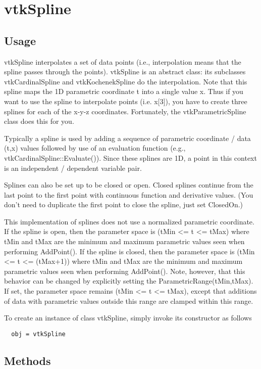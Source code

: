 \section{vtkSpline}

\subsection{Usage}

 vtkSpline interpolates a set of data points (i.e., interpolation means
 that the spline passes through the points).  vtkSpline is an abstract
 class: its subclasses vtkCardinalSpline and vtkKochenekSpline do the
 interpolation. Note that this spline maps the 1D parametric coordinate
 t into a single value x. Thus if you want to use the spline to 
 interpolate points (i.e. x[3]), you have to create three splines for
 each of the x-y-z coordinates. Fortunately, the vtkParametricSpline
 class does this for you.

 Typically a spline is used by adding a sequence of parametric coordinate /
 data (t,x) values followed by use of an evaluation function (e.g.,
 vtkCardinalSpline::Evaluate()).  Since these splines are 1D, a point in
 this context is an independent / dependent variable pair. 

 Splines can also be set up to be closed or open. Closed splines continue
 from the last point to the first point with continuous function and 
 derivative values. (You don't need to duplicate the first point to close
 the spline, just set ClosedOn.) 

 This implementation of splines does not use a normalized parametric
 coordinate. If the spline is open, then the parameter space is (tMin <= t
 <= tMax) where tMin and tMax are the minimum and maximum parametric values
 seen when performing AddPoint(). If the spline is closed, then the
 parameter space is (tMin <= t <= (tMax+1)) where tMin and tMax are the
 minimum and maximum parametric values seen when performing AddPoint().
 Note, however, that this behavior can be changed by explicitly setting
 the ParametricRange(tMin,tMax). If set, the parameter space remains
 (tMin <= t <= tMax), except that additions of data with parametric
 values outside this range are clamped within this range.

To create an instance of class vtkSpline, simply
invoke its constructor as follows
\begin{verbatim}
  obj = vtkSpline
\end{verbatim}
\subsection{Methods}

